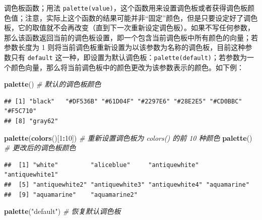 \documentclass[
  b5paper,
  UTF8,twoside]{book}
\newenvironment{Shaded}{\begin{snugshade}}{\end{snugshade}}
\newcommand{\CommentTok}[1]{\textcolor[rgb]{0.56,0.35,0.01}{\textit{#1}}}
\newcommand{\DecValTok}[1]{\textcolor[rgb]{0.00,0.00,0.81}{#1}}
\newcommand{\FunctionTok}[1]{\textcolor[rgb]{0.13,0.29,0.53}{\textbf{#1}}}
\newcommand{\NormalTok}[1]{#1}
\newcommand{\SpecialCharTok}[1]{\textcolor[rgb]{0.81,0.36,0.00}{\textbf{#1}}}
\newcommand{\StringTok}[1]{\textcolor[rgb]{0.31,0.60,0.02}{#1}}
\providecommand{\tightlist}{%
  \setlength{\itemsep}{0pt}\setlength{\parskip}{0pt}}
\begin{document}
\begin{description}
\tightlist
\item[\texttt{palette()}]
调色板函数；用法 \texttt{palette(value)}，这个函数用来设置调色板或者获得调色板颜色值；注意，实际上这个函数的结果可能并非``固定''颜色，但是只要设定好了调色板，它的取值就不会再改变（直到下一次重新设定调色板）。如果不写任何参数，那么该函数返回当前的调色板设置，即一个包含当前调色板中所有颜色的向量；若参数长度为 1 则将当前调色板重新设置为以该参数为名称的调色板，目前这种参数只有 \texttt{\textquotesingle{}default\textquotesingle{}} 这一种，即设置为默认调色板：\texttt{palette(\textquotesingle{}default\textquotesingle{})}；若参数为一个颜色向量，那么将当前调色板中的颜色更改为该参数表示的颜色。如下例：
\end{description}

\begin{Shaded}
\begin{Highlighting}[]
\FunctionTok{palette}\NormalTok{() }\CommentTok{\# 默认的调色板颜色}
\end{Highlighting}
\end{Shaded}

\begin{verbatim}
## [1] "black"   "#DF536B" "#61D04F" "#2297E6" "#28E2E5" "#CD0BBC" "#F5C710"
## [8] "gray62"
\end{verbatim}

\begin{Shaded}
\begin{Highlighting}[]
\FunctionTok{palette}\NormalTok{(}\FunctionTok{colors}\NormalTok{()[}\DecValTok{1}\SpecialCharTok{:}\DecValTok{10}\NormalTok{]) }\CommentTok{\# 重新设置调色板为 colors() 的前 10 种颜色}
\FunctionTok{palette}\NormalTok{() }\CommentTok{\# 更改后的调色板颜色}
\end{Highlighting}
\end{Shaded}

\begin{verbatim}
##  [1] "white"         "aliceblue"     "antiquewhite"  "antiquewhite1"
##  [5] "antiquewhite2" "antiquewhite3" "antiquewhite4" "aquamarine"   
##  [9] "aquamarine"    "aquamarine2"
\end{verbatim}

\begin{Shaded}
\begin{Highlighting}[]
\FunctionTok{palette}\NormalTok{(}\StringTok{"default"}\NormalTok{) }\CommentTok{\# 恢复默认调色板}
\end{Highlighting}
\end{Shaded}
\end{document}
